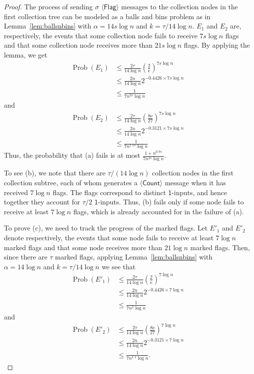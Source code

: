 \documentclass[11pt,letter]{article}
\newcommand{\e}{\mathrm{e}}
\DeclareMathOperator*{\Prob}{Prob}
\theoremstyle{mytheoremstyle}
\newcommand{\bins}{k}
\newcommand{\flag}{$\langle\mathsf{Flag}\rangle$\xspace}
\newcommand{\countm}{$\langle\mathsf{Count}\rangle$\xspace}
\newcommand{\oneinputs}{$\mathsf{1}$-inputs\xspace}
\begin{document}
\begin{proof}
	The process of sending $\sigma$ \flag messages to the collection nodes in the first collection tree can be modeled as a balls and bins problem as in Lemma~\ref{lem:ballsnbins}  with $\alpha = 14s\log{n}$ and $\bins =\tau /14\log{n}$.
	$E_1$ and $E_2$ are, respectively, the events that some collection node fails to receive $7s\log{n}$ flags and that some collection node receives more than $21s\log{n}$ flags.
	By applying the lemma, we get
	\vspace{-0.07em}
	\begin{align*}
		\Prob(E_1) &\le \frac{2\tau}{14\log{n}}\left(\frac2{\e}\right)^{7s\log{n}} \\
		&\le \frac{2 n}{14\log{n}} 2^{-0.4426 \times 7s\log n} \\
		&\le \frac{1}{7n^{2s}\log{n}}
	\end{align*}
	and
	\begin{align*}
		\Prob (E_2) &\le \frac{2 \tau}{14\log{n}}
		\left(\frac{8\e}{27}\right)^{7s\log{n}} \\
		&\le \frac{2 n}{14\log{n}}2^{-0.3121 \times 7s\log{n}} \\
		&\le \frac{1}{7n^{1.1s}\log{n}}
	\end{align*}
	Thus, the probability that (a) fails is at most $\frac{1+n^{0.9s}}{7n^{2s}\log{n}}$.
	
	To see (b), we note that there are $\tau/(14\log{n})$ collection nodes in the first collection subtree, each of whom generates a \countm message when it has received $7\log{n}$ flags. The flags correspond to distinct \oneinputs, and hence together they account for $\tau/2$ \oneinputs.
	Thus, (b) fails only if some node fails to receive at least $7\log{n}$ flags, which is already accounted for in the failure of (a).
	
	To prove (c), we need to track the progress of the marked flags.
	Let $E'_1$ and $E'_2$ denote respectively, the events that some node fails to receive at least $7\log{n}$ marked flags and that some node receives more than $21\log{n}$ marked flags. Then, since there are $\tau$ marked flags, applying Lemma~\ref{lem:ballsnbins} with $\alpha = 14\log{n}$ and $\bins = \tau/14\log{n}$ we see that
	\begin{align*}
		\Prob(E'_1) &\le \frac{2\tau}{14\log{n}}\left(\frac2{\e}\right)^{7\log{n}} \\
		&\le \frac{2 n}{14\log{n}} 2^{-0.4426 \times 7\log n} \\
		&\le \frac{1}{7n^{2}\log{n}}
	\end{align*}
	and
	\begin{align*}
		\Prob (E'_2) &\le \frac{2 \tau}{14\log{n}} \left(\frac{8\e}{27}\right)^{7\log{n}}\\
		&\le \frac{2 n}{14\log{n}}2^{-0.3121 \times 7\log{n}} \\
		&\le \frac{1}{7n^{1.1}\log{n}}.
	\end{align*}
	

\end{proof}
\end{document}
